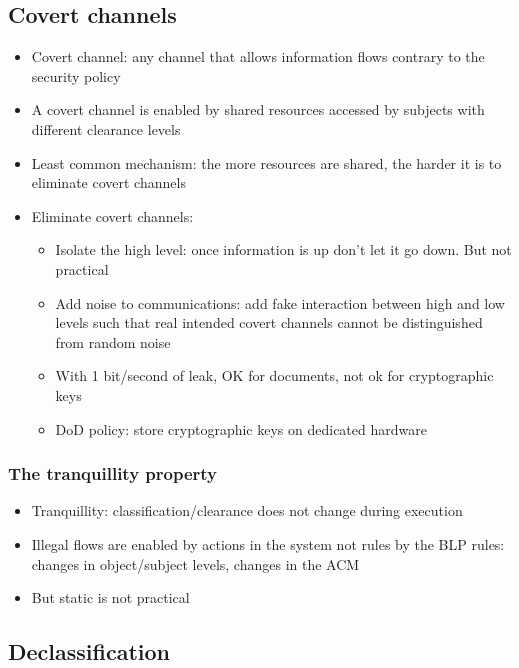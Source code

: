 \documentclass{article}
\newenvironment{myitemize}
{ \begin{itemize}
    \setlength{\itemsep}{005pt}
    \setlength{\parskip}{0pt}
    \setlength{\parsep}{0pt}     }
{ \end{itemize}                  }
\begin{document}
\begin{multicols}{2}
\subsection{Covert channels}

\begin{myitemize}
    \item Covert channel: any channel that allows information flows contrary to the security policy
    \item A covert channel is enabled by shared resources accessed by subjects with different clearance levels
    \item Least common mechanism: the more resources are shared, the harder it is to eliminate covert channels 
    \item Eliminate covert channels: 
    \begin{myitemize}
        \item Isolate the high level: once information is up don't let it go down. But not practical
        \item Add noise to communications: add fake interaction between high and low levels such that real intended covert channels cannot be distinguished from random noise
        \item With 1 bit/second of leak, OK for documents, not ok for cryptographic keys
        \item DoD policy: store cryptographic keys on dedicated hardware
    \end{myitemize}
\end{myitemize}

\subsubsection{The tranquillity property}

\begin{myitemize}
    \item Tranquillity: classification/clearance does not change during execution
    \item Illegal flows are enabled by actions in the system not rules by the BLP rules: changes in object/subject levels,  changes in the ACM
    \item But static is not practical
\end{myitemize}


\subsection{Declassification}


\end{multicols}
\end{document}
